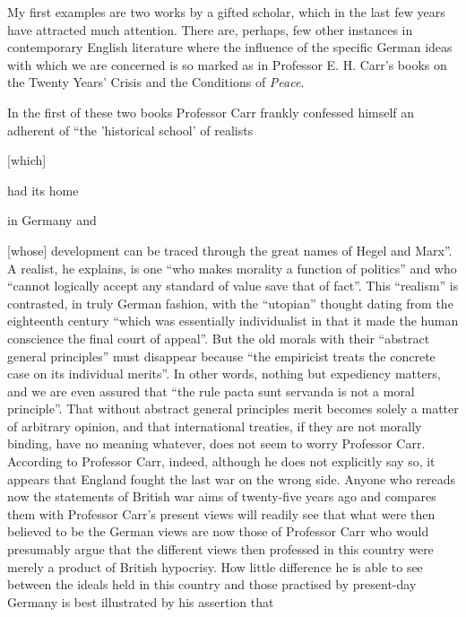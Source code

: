 \documentclass[11pt,openany]{book}
\begin{document}
\begin{center}\textasteriskcentered\hspace{0.9em}\textasteriskcentered\hspace{0.9em}\textasteriskcentered\end{center}

My first examples are two works by a gifted scholar, which in the last few years have attracted much attention. There are, perhaps, few other instances in contemporary English literature where the influence of the specific German ideas with which we are concerned is so marked as in Professor E. H. Carr's books on the Twenty Years' Crisis and the Conditions of \emph{Peace}.

In the first of these two books Professor Carr frankly confessed himself an adherent of ``the 'historical school' of realists

[which]

had its home

in Germany and

[whose] development can be traced through the great names of Hegel and Marx''. A realist, he explains, is one ``who makes morality a function of politics'' and who ``cannot logically accept any standard of value save that of fact''. This ``realism'' is contrasted, in truly German fashion, with the ``utopian'' thought dating from the eighteenth century ``which was essentially individualist in that it made the human conscience the final court of appeal''. But the old morals with their ``abstract general principles'' must disappear because ``the empiricist treats the concrete case on its individual merits''. In other words, nothing but expediency matters, and we are even assured that ``the rule pacta sunt servanda is not a moral principle''. That without abstract general principles merit becomes solely a matter of arbitrary opinion, and that international treaties, if they are not morally binding, have no meaning whatever, does not seem to worry Professor Carr. According to Professor Carr, indeed, although he does not explicitly say so, it appears that England fought the last war on the wrong side. Anyone who rereads now the statements of British war aims of twenty-five years ago and compares them with Professor Carr's present views will readily see that what were then believed to be the German views are now those of Professor Carr who would presumably argue that the different views then professed in this country were merely a product of British hypocrisy. How little difference he is able to see between the ideals held in this country and those practised by present-day Germany is best illustrated by his assertion that
\end{document}
